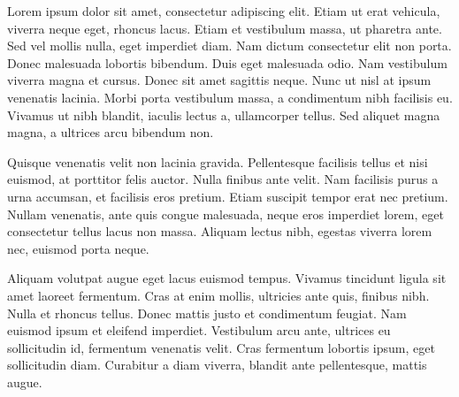 Lorem ipsum dolor sit amet, consectetur adipiscing elit. Etiam ut erat vehicula, viverra neque eget, rhoncus lacus. Etiam et vestibulum massa, ut pharetra ante. Sed vel mollis nulla, eget imperdiet diam. Nam dictum consectetur elit non porta. Donec malesuada lobortis bibendum. Duis eget malesuada odio. Nam vestibulum viverra magna et cursus. Donec sit amet sagittis neque. Nunc ut nisl at ipsum venenatis lacinia. Morbi porta vestibulum massa, a condimentum nibh facilisis eu. Vivamus ut nibh blandit, iaculis lectus a, ullamcorper tellus. Sed aliquet magna magna, a ultrices arcu bibendum non.

Quisque venenatis velit non lacinia gravida. Pellentesque facilisis tellus et nisi euismod, at porttitor felis auctor. Nulla finibus ante velit. Nam facilisis purus a urna accumsan, et facilisis eros pretium. Etiam suscipit tempor erat nec pretium. Nullam venenatis, ante quis congue malesuada, neque eros imperdiet lorem, eget consectetur tellus lacus non massa. Aliquam lectus nibh, egestas viverra lorem nec, euismod porta neque.

Aliquam volutpat augue eget lacus euismod tempus. Vivamus tincidunt ligula sit amet laoreet fermentum. Cras at enim mollis, ultricies ante quis, finibus nibh. Nulla et rhoncus tellus. Donec mattis justo et condimentum feugiat. Nam euismod ipsum et eleifend imperdiet. Vestibulum arcu ante, ultrices eu sollicitudin id, fermentum venenatis velit. Cras fermentum lobortis ipsum, eget sollicitudin diam. Curabitur a diam viverra, blandit ante pellentesque, mattis augue.
